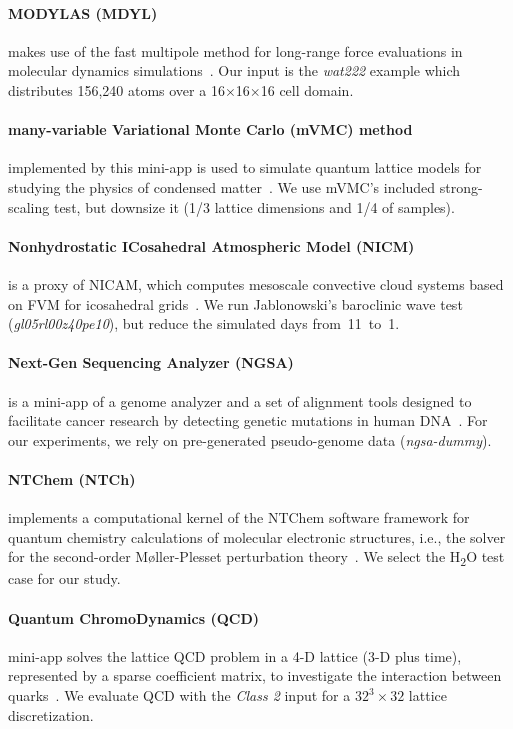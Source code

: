 \paragraph{MODYLAS (MDYL)} makes use of the fast multipole method for long-range force evaluations in
molecular dynamics simulations~\cite{andoh_modylas:_2013}.
Our input is the \textit{wat222} example which distributes 156,240 atoms over a
16$\times$16$\times$16 cell domain.

\paragraph{many-variable Variational Monte Carlo (mVMC) method} implemented by this mini-app is used
to simulate quantum lattice models for studying the physics of condensed matter~\cite{misawa_mvmc--open-source_2018}.
We use mVMC's included strong-scaling test, but downsize it (1/3 lattice dimensions and 1/4 of samples). 

\paragraph{Nonhydrostatic ICosahedral Atmospheric Model (NICM)} is a proxy of NICAM, which
computes mesoscale convective cloud systems based on FVM for icosahedral grids~\cite{tomita_new_2004}.
We run Jablonowski's baroclinic wave test (\textit{gl05rl00z40pe10}), but reduce the
simulated days from~11~to~1.

\paragraph{Next-Gen Sequencing Analyzer (NGSA)} is a mini-app of a genome analyzer and a set of
alignment tools designed to facilitate cancer research by detecting genetic mutations in
human DNA~\cite{riken_csrp_grand_2013}.
For our experiments, we rely on pre-generated pseudo-genome data (\textit{ngsa-dummy}).

\paragraph{NTChem (NTCh)} implements a computational kernel of the NTChem software framework
for quantum chemistry calculations of molecular electronic structures, i.e., the solver for the
second-order M{\o}ller-Plesset perturbation theory~\cite{nakajima_ntchem:_2014}. We select the
H\textsubscript{2}O test case for our study.

\paragraph{Quantum ChromoDynamics (QCD)} mini-app solves the lattice QCD problem in a 4-D
lattice (3-D plus time), represented by a sparse coefficient matrix, to investigate the
interaction between quarks~\cite{boku_multi-block/multi-core_2012}. We evaluate QCD with the \textit{Class 2}
input for a $32^3 \times 32$ lattice discretization.


